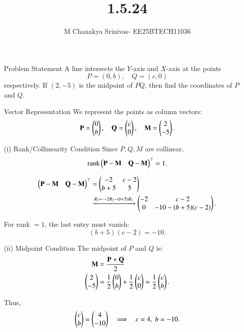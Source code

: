 \documentclass{beamer}
\title %
{1.5.24}
\date{}
\author %
{M Chanakya Srinivas- EE25BTECH11036}
\begin{document}
\begin{frame}
  \titlepage
\end{frame}



\begin{frame}{Problem Statement}
A line intersects the $Y$-axis and $X$-axis at the points
\[
P = (0,b), \quad Q = (c,0)
\]
respectively. If $(2,-5)$ is the midpoint of $\overline{PQ}$, then find the coordinates of $P$ and $Q$.
\end{frame}

\begin{frame}{Vector Representation}
We represent the points as column vectors:
\[
\mathbf P = \begin{pmatrix}0 \\ b\end{pmatrix}, \quad 
\mathbf Q = \begin{pmatrix}c \\ 0\end{pmatrix}, \quad
\mathbf M = \begin{pmatrix}2 \\ -5\end{pmatrix}.
\]
\end{frame}

\begin{frame}{(i) Rank/Collinearity Condition}
Since $P, Q, M$ are collinear,
\[
\operatorname{rank}\begin{pmatrix}\mathbf P - \mathbf M \quad \mathbf Q - \mathbf M\end{pmatrix}^{\top} = 1.
\]

\begin{align*}
\begin{pmatrix}\mathbf P - \mathbf M & \mathbf Q - \mathbf M\end{pmatrix}^{\top} 
&= \begin{pmatrix}-2 & c-2 \\ b+5 & 5\end{pmatrix} \\
&\xrightarrow{R_2 \leftarrow -2R_2 - (b+5)R_1}
\begin{pmatrix}-2 & c-2 \\ 0 & -10 - (b+5)(c-2)\end{pmatrix}.
\end{align*}

For rank $=1$, the last entry must vanish:
\[
(b+5)(c-2) = -10. \tag{*}
\]
\end{frame}

\begin{frame}{(ii) Midpoint Condition}
The midpoint of $P$ and $Q$ is:
\begin{align*}
\mathbf M &= \frac{\mathbf P + \mathbf Q}{2} \\
\begin{pmatrix}2 \\ -5\end{pmatrix} &= \frac{1}{2}\begin{pmatrix}0 \\ b\end{pmatrix} + \frac{1}{2}\begin{pmatrix}c \\ 0\end{pmatrix}
= \frac{1}{2}\begin{pmatrix}c \\ b\end{pmatrix}.
\end{align*}

Thus,
\[
\begin{pmatrix}c \\ b\end{pmatrix} = \begin{pmatrix}4 \\ -10\end{pmatrix}
\quad\Longrightarrow\quad c=4, \; b=-10.
\]
\end{frame}
\end{document}
